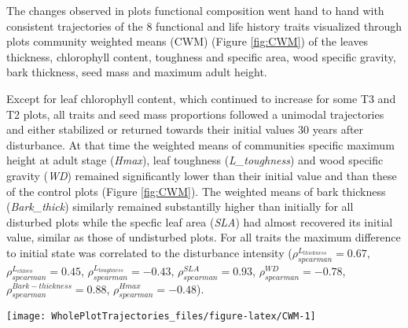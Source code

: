 \documentclass[fleqn,10pt]{ArtEcoFoG} %
\theoremstyle{definition}
\theoremstyle{definition}
\theoremstyle{definition}
\theoremstyle{remark}
\begin{document}
The changes observed in plots functional composition went hand to hand
with consistent trajectories of the 8 functional and life history traits
visualized through plots community weighted means (CWM) (Figure
\ref{fig:CWM}) of the leaves thickness, chlorophyll content, toughness
and specific area, wood specific gravity, bark thickness, seed mass and
maximum adult height.

Except for leaf chlorophyll content, which continued to increase for
some T3 and T2 plots, all traits and seed mass proportions followed a
unimodal trajectories and either stabilized or returned towards their
initial values 30 years after disturbance. At that time the weighted
means of communities specific maximum height at adult stage
(\emph{Hmax}), leaf toughness (\emph{L\_toughness}) and wood specific
gravity (\emph{WD}) remained significantly lower than their initial
value and than these of the control plots (Figure \ref{fig:CWM}). The
weighted means of bark thickness (\emph{Bark\_thick}) similarly remained
substantilly higher than initially for all disturbed plots while the
specfic leaf area (\emph{SLA}) had almost recovered its initial value,
similar as those of undisturbed plots. For all traits the maximum
difference to initial state was correlated to the disturbance intensity
(\(\rho_{spearman}^{L_{thickness}}=0.67\),
\(\rho_{spearman}^{L_{chloro}}=0.45\),
\(\rho_{spearman}^{L_{toughness}}=-0.43\),
\(\rho_{spearman}^{SLA}=0.93\), \(\rho_{spearman}^{WD}=-0.78\),
\(\rho_{spearman}^{Bark-thickness}=0.88\),
\(\rho_{spearman}^{Hmax}=-0.48\)).

\begin{figure*}

{\centering \texttt{[image: WholePlotTrajectories\_files/figure-latex/CWM-1]} 

}

\caption{Trajectories of the communities weighted means (CWM) over 30 years after disturbance of 4 leaf traits (Leaf thickness, \emph{L\_thickness}, chlorophyll content, \emph{L\_chloro}, toughness, \emph{L\_toughness} and specific area, \emph{SLA}), 2 stem traits (wood specific gravity, \emph{WD}, and bark thickness, \emph{Bark-thick}) and one life trait (Specific maximum height at adult stage, \emph{Hmax}). Trajectories correspond to the median (solid line) and 0.025 and 0.975 percentile (gray envelope) observed after 50 iteration of the taxonomic uncertainty propagation and the missing trait value filling processes. Initial treatments are represented by solid lines colors with green for control, blue for T1,orange for T2 and red for T3.}\label{fig:CWM}
\end{figure*}
\end{document}
